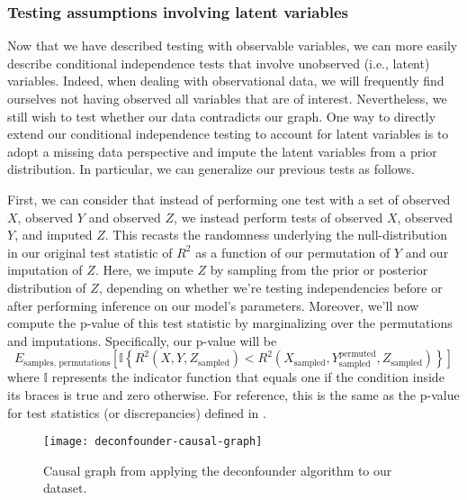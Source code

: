\subsubsection{Testing assumptions involving latent variables}
\label{sec:latent-tests}
Now that we have described testing with observable variables, we can more easily describe conditional independence tests that involve unobserved (i.e., latent) variables.
Indeed, when dealing with observational data, we will frequently find ourselves not having observed all variables that are of interest.
Nevertheless, we still wish to test whether our data contradicts our graph.
One way to directly extend our conditional independence testing to account for latent variables is to adopt a missing data perspective and impute the latent variables from a prior distribution.
In particular, we can generalize our previous tests as follows.

First, we can consider that instead of performing one test with a set of observed $X$, observed $Y$ and observed $Z$, we instead perform tests of observed $X$, observed $Y$, and imputed $Z$.
This recasts the randomness underlying the null-distribution in our original test statistic of $R^2$ as a function of our permutation of $Y$ and our imputation of $Z$.
Here, we impute $Z$ by sampling from the prior or posterior distribution of $Z$, depending on whether we're testing independencies before or after performing inference on our model's parameters.
Moreover, we'll now compute the p-value of this test statistic by marginalizing over the permutations and imputations.
Specifically, our p-value will be
\begin{equation}
E_{\textrm{samples, permutations}} \left[ \mathbb{I} \left \lbrace R^2 \left( X, Y, Z_{\textrm{sampled}} \right) <  R^2 \left( X_{\textrm{sampled}}, Y_{\textrm{sampled}} ^{\textrm{permuted}}, Z_{\textrm{sampled}} \right) \right \rbrace \right]
\end{equation}
where $\mathbb{I}$ represents the indicator function that equals one if the condition inside its braces is true and zero otherwise.
For reference, this is the same as the p-value for test statistics (or discrepancies) defined in \citet[Eq. 7]{gelman_1996_posterior}.

\begin{figure}
   \centering
   \texttt{[image: deconfounder-causal-graph]}
   \caption{Causal graph from applying the deconfounder algorithm \citep{wang_2019_blessings} to our dataset.}
   \label{fig:deconfounder-graph}
\end{figure}

